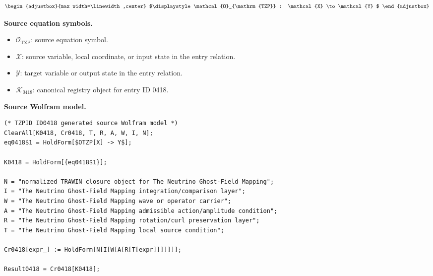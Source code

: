 \[
\begin{adjustbox}{max width=\linewidth,center}
$\displaystyle
\mathcal{O}_{\mathrm{TZP}} : \mathcal{X} \to \mathcal{Y}
$
\end{adjustbox}
\]

\begin{minipage}[t]{0.49\linewidth}
\begingroup
\small
\raggedright
\textbf{Source equation symbols.}\par
\begin{itemize}[leftmargin=1.35em,itemsep=1pt,topsep=1pt,parsep=0pt]
    \item $\mathcal{O}_{\mathrm{TZP}}$: source equation symbol.
    \item $\mathcal{X}$: source variable, local coordinate, or input state in the entry relation.
    \item $\mathcal{Y}$: target variable or output state in the entry relation.
    \item $\mathcal{K}_{0418}$: canonical registry object for entry ID 0418.
\end{itemize}
\endgroup
\end{minipage}\hfill
\begin{minipage}[t]{0.47\linewidth}
\begingroup
\scriptsize
\raggedright
\textbf{Source Wolfram model.}\par
\begin{Verbatim}[fontsize=\tiny,breaklines=true,breakanywhere=true]
(* TZPID ID0418 generated source Wolfram model *)
ClearAll[K0418, Cr0418, T, R, A, W, I, N];
eq0418$1 = HoldForm[$OTZP[X] -> Y$];

K0418 = HoldForm[{eq0418$1}];

N = "normalized TRAWIN closure object for The Neutrino Ghost-Field Mapping";
I = "The Neutrino Ghost-Field Mapping integration/comparison layer";
W = "The Neutrino Ghost-Field Mapping wave or operator carrier";
A = "The Neutrino Ghost-Field Mapping admissible action/amplitude condition";
R = "The Neutrino Ghost-Field Mapping rotation/curl preservation layer";
T = "The Neutrino Ghost-Field Mapping local source condition";

Cr0418[expr_] := HoldForm[N[I[W[A[R[T[expr]]]]]]];

Result0418 = Cr0418[K0418];
\end{Verbatim}
\endgroup
\end{minipage}

